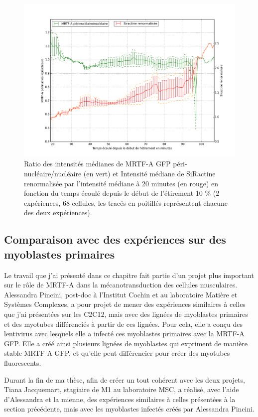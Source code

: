 \begin{figure}
\includegraphics[scale=0.4]{Figures/C2C12.png} 
\caption{Ratio des intensités médianes de MRTF-A GFP péri-nucléaire/nucléaire (en vert) et Intensité médiane de SiRactine renormalisée par l'intensité médiane à 20 minutes (en rouge)  en fonction du temps écoulé depuis le début de l'étirement 10 \% (2 expériences, 68 cellules, les tracés en poitillés représentent chacune des deux expériences).\label{Siractine_quantif}}
\end{figure}
 


\subsection{Comparaison avec des expériences sur des myoblastes primaires}

Le travail que j'ai présenté dans ce chapitre fait partie d'un projet plus important sur le rôle de MRTF-A dans la mécanotransduction des cellules musculaires. Alessandra Pincini, post-doc à l'Institut Cochin et au laboratoire Matière et Systèmes Complexes, a pour projet de mener des expériences similaires à celles que j'ai présentées sur les C2C12, mais avec des lignées de myoblastes primaires et des myotubes différenciés à partir de ces lignées. Pour cela, elle a conçu des lentivirus avec lesquels elle a infecté ces myoblastes primaires avec la MRTF-A GFP. Elle a créé ainsi plusieurs lignées de myoblastes qui expriment de manière stable MRTF-A GFP, et qu'elle peut différencier pour créer des myotubes fluorescents. 

Durant la fin de ma thèse, afin de créer un tout cohérent avec les deux projets, Tiana Jacquemart, stagiaire de M1 au laboratoire MSC, a réalisé, avec l'aide d'Alessandra et la mienne, des expériences similaires à celles présentées à la section précédente, mais avec les myoblastes infectés créés par Alessandra Pincini. 

